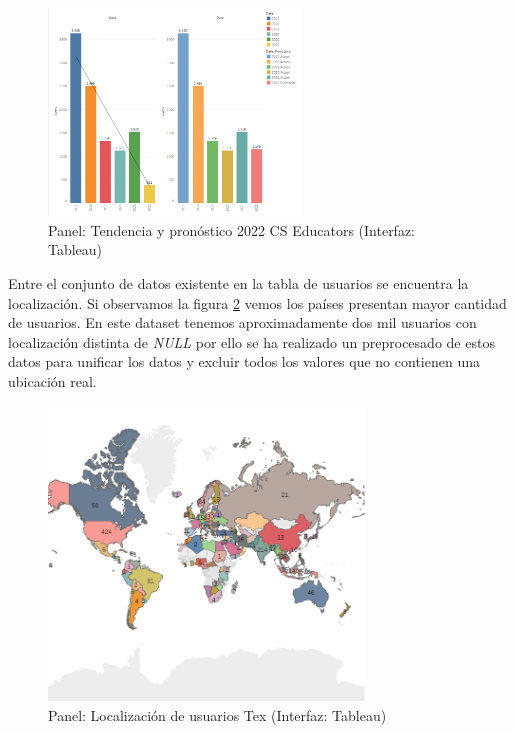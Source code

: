 \documentclass[a4paper, 12pt]{book}
\begin{document}
\begin{figure}[ht]
    \centering
    \includegraphics[width=0.6\textwidth]{img/cse/Tendencia_pronostico_CsE.png}
    \caption{Panel: Tendencia y pronóstico 2022 CS Educators (Interfaz: Tableau)}
    \label{figura:tendencia_cse}
\end{figure}




Entre el conjunto de datos existente en la tabla de usuarios se encuentra la localización. Si observamos la figura \ref{figura:MAP_users_cse} vemos los países presentan mayor cantidad de usuarios. En este dataset tenemos aproximadamente dos mil usuarios con localización distinta de \emph{NULL} por ello se ha realizado un preprocesado de estos datos para unificar los datos y excluir todos los valores que no contienen una ubicación real. 

\begin{figure}[ht]
    \centering
    \includegraphics[width=0.75\textwidth]{img/cse/Maps_cse.png}
    \caption{Panel: Localización de usuarios Tex (Interfaz: Tableau)}
    \label{figura:MAP_users_cse}
\end{figure}
\end{document}
